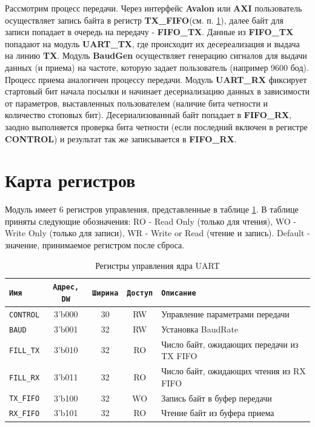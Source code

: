 \documentclass[a4paper,12pt]{article}
\begin{document}
Рассмотрим процесс передачи. Через интерфейс \textbf{Avalon} или \textbf{AXI} пользователь осуществляет запись байта в регистр \textbf{TX\_FIFO}(см. п. \ref{sec:register_map}), далее байт для записи попадает в очередь на передачу - \textbf{FIFO\_TX}. Данные из \textbf{FIFO\_TX} попадают на модуль \textbf{UART\_TX}, где происходит их десереализация и выдача на линию \textbf{TX}. Модуль \textbf{BaudGen} осуществляет генерацию сигналов для выдачи данных (и приема) на частоте, которую задает пользователь (например 9600 бод).
Процесс приема аналогичен процессу передачи. Модуль \textbf{UART\_RX} фиксирует стартовый бит начала посылки и начинает десериализацию данных в зависимости от параметров, выставленных пользователем (наличие бита четности и количество стоповых бит). Десериализованный байт попадает в \textbf{FIFO\_RX}, заодно выполняется проверка бита четности (если последний включен в регистре \textbf{CONTROL}) и результат так же записывается в \textbf{FIFO\_RX}.



\newpage
\section{Карта регистров}
\label{sec:register_map}

Модуль имеет 6 регистров управления, представленные в таблице {\ref{tbl:uart_regs}}. В таблице приняты следующие обозначения: RO - Read Only (только для чтения), WO - Write Only (только для записи), WR - Write or Read (чтение и запись). Default - значение, принимаемое регистром после сброса.

\begin{table}[H]
  \begin{center}
    \begin{tabular}{l|c|c|c|l}
      \rowcolor[gray]{0.7} {\tt Имя} & {\tt Адрес, DW} & {\tt Ширина} & {\tt Доступ} & {\tt Описание} \\ \hline \hline
      {\tt CONTROL}   & 3'b000 & 30 & RW & Управление параметрами передачи\\ \hline
      {\tt BAUD}      & 3'b001 & 32 & RW & Установка BaudRate\\ \hline
      {\tt FILL\_TX}  & 3'b010 & 32 & RO & Число байт, ожидающих передачи из TX FIFO\\ \hline
      {\tt FILL\_RX}  & 3'b011 & 32 & RO & Число байт, ожидающих чтения из RX FIFO\\ \hline
      {\tt TX\_FIFO}   & 3'b100 & 32 & WO & Запись байт в буфер передачи\\ \hline
      {\tt RX\_FIFO}   & 3'b101 & 32 & RO & Чтение байт из буфера приема\\ \hline
    \end{tabular}
    \caption{Регистры управления ядра UART}
    \label{tbl:uart_regs}
    \end{center}
\end{table}
\end{document}
